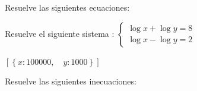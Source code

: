 \documentclass[addpoints,spanish, 12pt,a4paper]{exam}
\begin{document}
\begin{questions}
\question[2] Resuelve las siguientes ecuaciones:


\question[1] Resuelve el siguiente sistema :
$ \left\{\begin{matrix}\log x + \log y = 8 \\\log x - \log y = 2\end{matrix}\right. $  \begin{solution}  $ \left [ \left \{ x : 100000, \quad y : 1000\right \}\right ] $  \end{solution} 




        
\question Resuelve las siguientes inecuaciones:
 
        \begin{parts} 
                

\end{parts}
\end{questions}
\end{document}
